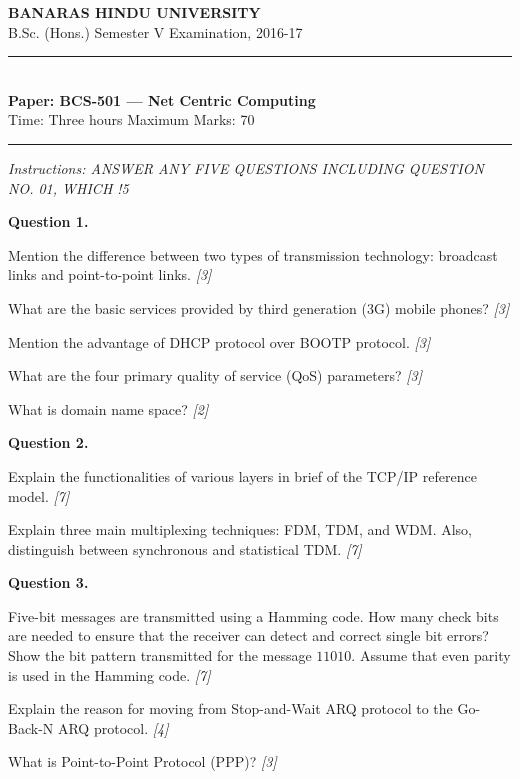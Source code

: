 \documentclass[11pt,a4paper]{article}
\newcommand{\pts}[1]{\hfill   \textit{[#1]}}
\begin{document}
\begin{center}
  {\large\bfseries BANARAS HINDU UNIVERSITY}\\[2pt]
  {
\normalsize B.Sc. (Hons.) Semester V Examination, 2016-17}\\[6pt]
  \rule{0.8\linewidth}{0.5pt}\\[6pt]
  {\large\bfseries Paper: BCS-501 --- Net Centric Computing}\\[4pt]
  {
\normalsize Time: Three hours \hfill Maximum Marks: 70}
\end{center}

\rule{\linewidth}{0.4pt}

\smallskip



\noindent   \textit{Instructions: ANSWER ANY FIVE QUESTIONS INCLUDING QUESTION NO. 01, WHICH !5}

\bigskip

\medskip


\noindent   \textbf{Question 1.}

\begin{parts}
  \item Mention the difference between two types of transmission technology: broadcast links and point-to-point links. \pts{3}
  \item What are the basic services provided by third generation (3G) mobile phones? \pts{3}
  \item Mention the advantage of DHCP protocol over BOOTP protocol. \pts{3}
  \item What are the four primary quality of service (QoS) parameters? \pts{3}
  \item What is domain name space? \pts{2}
\end{parts}

\medskip


\noindent   \textbf{Question 2.}

\begin{parts}
  \item Explain the functionalities of various layers in brief of the TCP/IP reference model. \pts{7}
  \item Explain three main multiplexing techniques: FDM, TDM, and WDM. Also, distinguish between synchronous and statistical TDM. \pts{7}
\end{parts}

\medskip


\noindent   \textbf{Question 3.}

\begin{parts}
  \item Five-bit messages are transmitted using a Hamming code. How many check bits are needed to ensure that the receiver can detect and correct single bit errors? Show the bit pattern transmitted for the message $11010$. Assume that even parity is used in the Hamming code. \pts{7}
  \item Explain the reason for moving from Stop-and-Wait ARQ protocol to the Go-Back-N ARQ protocol. \pts{4}
  \item What is Point-to-Point Protocol (PPP)? \pts{3}
\end{parts}
\end{document}
